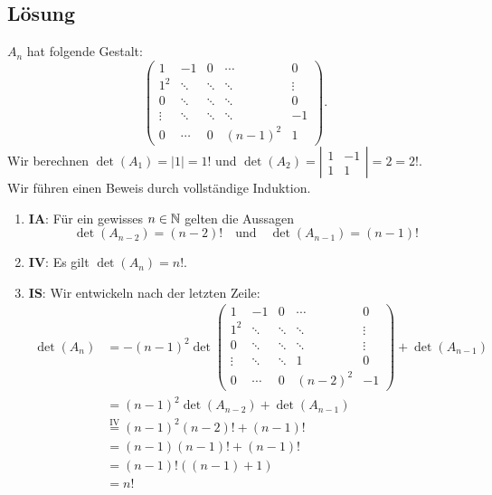 \subsection{Lösung}
\( A_n \) hat folgende Gestalt:
\begin{equation*}
	\begin{pmatrix}
		1 & -1 & 0 & \cdots & 0 \\
		1^2 & \ddots & \ddots & \ddots & \vdots \\
		0 & \ddots & \ddots & \ddots & 0 \\
		\vdots & \ddots & \ddots & \ddots & -1 \\
		0 & \cdots & 0 & (n-1)^2 & 1
	\end{pmatrix}\text{.}
\end{equation*}
Wir berechnen \( \det(A_1) = |1| = 1! \) und \( \det(A_2) = \left| \begin{smallmatrix}
	1 & -1 \\
	1 & 1
\end{smallmatrix} \right| = 2 = 2! \). \\
Wir führen einen Beweis durch vollständige Induktion.
\begin{enumerate}
	\item \textbf{IA}: Für ein gewisses \( n \in \mathbb{N} \) gelten die Aussagen
	\begin{equation*}
	 	\det(A_{n-2}) = (n-2)! \quad \text{und} \quad \det(A_{n-1}) = (n-1)!
	 \end{equation*} 
	 \item \textbf{IV}: Es gilt \( \det(A_n) = n! \).
	 \item \textbf{IS}: Wir entwickeln nach der letzten Zeile:
	 \begin{align*}
	 	\det(A_n) &= -(n-1)^2 \det \left( \begin{smallmatrix}
	 		1 & -1 & 0 & \cdots & 0 \\
	 		1^2 & \ddots & \ddots & \ddots & \vdots \\
	 		0 & \ddots & \ddots & \ddots & \vdots \\
	 		\vdots & \ddots & \ddots & 1 & 0 \\
	 		0 & \cdots & 0 & (n-2)^2 & -1
	 	\end{smallmatrix} \right) + \det(A_{n-1}) \\
	 	 &= (n-1)^2 \det(A_{n-2}) + \det(A_{n-1}) \\
	 	 &\overset{\text{IV}}{=} (n-1)^2 (n-2)! + (n-1)! \\
	 	 &= (n-1)(n-1)! + (n-1)! \\
	 	 &= (n-1)!((n-1) + 1) \\
	 	 &= n!
	 \end{align*}

\end{enumerate}

